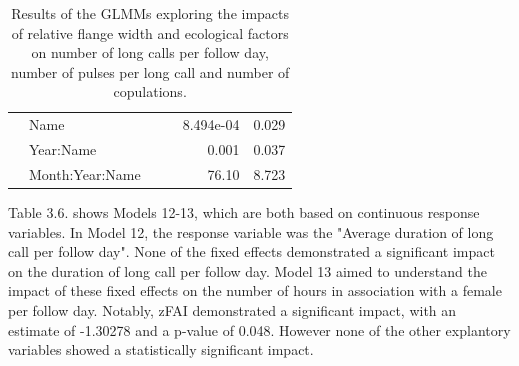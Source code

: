 \begin{table}
{\begin{tabular}{l l r r r r}
    \cline{2-6} 
    
 & Name & & & 8.494e-04 & 0.029 \\

    & Year:Name & & & 0.001 & 0.037 \\
    
    & Month:Year:Name & & & 76.10 & 8.723 \\
    
     \hline 
       \end{tabular}
}
    \caption{Results of the GLMMs exploring the impacts of relative flange width and ecological factors on number of long calls per follow day, number of pulses per long call and number of copulations.}
\end{table}
Table 3.6. shows Models 12-13, which are both based on continuous response variables. In Model 12, the response variable was the "Average duration of long call per follow day". None of the fixed effects demonstrated a significant impact on the duration of long call per follow day.  Model 13 aimed to understand the impact of these fixed effects on the number of hours in association with a female per follow day. Notably, zFAI demonstrated a significant impact, with an estimate of -1.30278 and a p-value of 0.048. However none of the other explantory variables showed a statistically significant impact.

